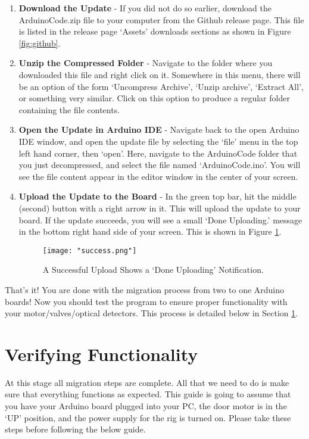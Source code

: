 \documentclass{article}
\begin{document}
\begin{enumerate}
    \item \textbf{Download the Update} - If you did not do so earlier, download the ArduinoCode.zip file to your computer from the Github release page. This 
        file is listed in the release page `Assets' downloads sections as shown in Figure \ref{fig:github}.
        \newpage 

    \item \textbf{Unzip the Compressed Folder} - Navigate to the folder where you downloaded this file and right click on it. Somewhere in this menu, there will be an option of the form
        `Uncompress Archive', `Unzip archive', `Extract All', or something very similar. Click on this option to produce a regular folder containing the file contents.
    \item \textbf{Open the Update in Arduino IDE} - Navigate back to the open Arduino IDE window, and open the update file by selecting the `file' menu in the top left hand corner, 
        then `open'. Here, navigate to the ArduinoCode folder that you just decompressed, and select the file named `ArduinoCode.ino'. You will see the file content appear in the editor 
        window in the center of your screen. 
    \item \textbf{Upload the Update to the Board} - In the green top bar, hit the middle (second) button with a right arrow in it. This will upload the 
        update to your board. If the update succeeds, you will see a small `Done Uploading.' message in the bottom right hand side of your screen. This is shown in Figure \ref{fig:success}.
        \begin{figure}[h!]
            \centering
            \texttt{[image: "success.png"]}
            \caption{A Successful Upload Shows a `Done Uploading' Notification.}
            \label{fig:success}
        \end{figure}
        \FloatBarrier
\end{enumerate}
That's it! You are done with the migration process from two to one Arduino boards! Now you should test the program to ensure proper functionality with your motor/valves/optical detectors.
This process is detailed below in Section \ref{sec:verifying-func}.

\FloatBarrier

\section{Verifying Functionality}
\label{sec:verifying-func}
At this stage all migration steps are complete. All that we need to do is make sure that everything functions as expected. This guide is going to assume that you have your Arduino board 
plugged into your PC, the door motor is in the `UP' position, and the power supply for the rig is turned on. Please take these steps before following the below guide.
\end{document}
